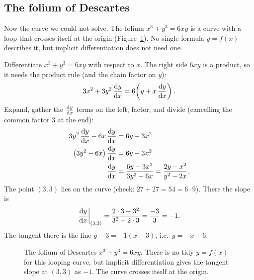 \subsection{The folium of Descartes}

Now the curve we could not solve. The folium $x^3 + y^3 = 6xy$ is a curve with a loop that crosses
itself at the origin (Figure~\ref{ch13:fig-folium}). No single formula $y=f(x)$ describes it, but
implicit differentiation does not need one.

\begin{example}
\label{ch13:ex-folium}
Differentiate $x^3 + y^3 = 6xy$ with respect to $x$. The right side $6xy$ is a product, so it needs
the product rule (and the chain factor on $y$):
\[
3x^2 + 3y^2\,\frac{\mathrm{d} y}{\mathrm{d} x} = 6\!\left(y + x\,\frac{\mathrm{d} y}{\mathrm{d} x}\right).
\]
Expand, gather the $\frac{\mathrm{d} y}{\mathrm{d} x}$ terms on the left, factor, and divide (cancelling the common
factor $3$ at the end):
\begin{align*}
3y^2\,\frac{\mathrm{d} y}{\mathrm{d} x} - 6x\,\frac{\mathrm{d} y}{\mathrm{d} x} &= 6y - 3x^2 \\
\left(3y^2 - 6x\right)\frac{\mathrm{d} y}{\mathrm{d} x} &= 6y - 3x^2 \\
\frac{\mathrm{d} y}{\mathrm{d} x} &= \frac{6y - 3x^2}{3y^2 - 6x} = \frac{2y - x^2}{y^2 - 2x}.
\end{align*}
The point $(3,3)$ lies on the curve (check: $27 + 27 = 54 = 6\cdot 9$). There the slope is
\[
\frac{\mathrm{d} y}{\mathrm{d} x}\bigg|_{(3,3)} = \frac{2\cdot 3 - 3^2}{3^2 - 2\cdot 3} = \frac{-3}{3} = -1.
\]
The tangent there is the line $y - 3 = -1(x-3)$, i.e.\ $y = -x + 6$.
\end{example}

\begin{figure}[H]
\centering
{}
\caption{The folium of Descartes $x^3+y^3=6xy$. There is no tidy $y=f(x)$ for this looping curve, but
implicit differentiation gives the tangent slope at $(3,3)$ as $-1$. The curve crosses itself at the
origin.}
\label{ch13:fig-folium}
\end{figure}

